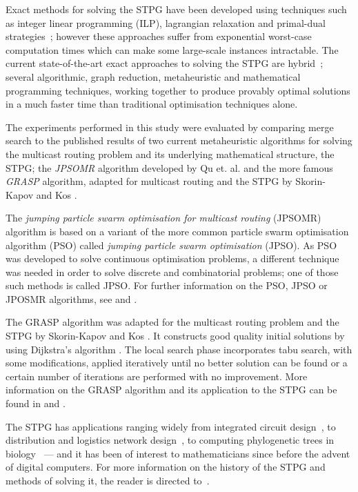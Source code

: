 \documentclass[journal]{IEEEtran}
\begin{document}

Exact methods for solving the STPG have been developed using techniques such as integer linear programming (ILP), lagrangian relaxation and primal-dual strategies~\cite{pd:polzin}; however these approaches suffer from exponential worst-case computation times which can make some large-scale instances intractable. The current state-of-the-art exact approaches to solving the STPG are hybrid~\cite{algo:polzin,algo:daneshmand}; several algorithmic, graph reduction, metaheuristic and mathematical programming techniques, working together to produce provably optimal solutions in a much faster time than traditional optimisation techniques alone.


The experiments performed in this study were evaluated by comparing merge search to the published results of two current metaheuristic algorithms for solving the multicast routing problem and its underlying mathematical structure, the STPG; the \emph{JPSOMR} algorithm developed by Qu et. al. \cite{jpsomr:qu} and the more famous \emph{GRASP} algorithm, adapted for multicast routing and the STPG by Skorin-Kapov and Kos \cite{grasp:skorin}.

The \emph{jumping particle swarm optimisation for multicast routing} (JPSOMR) algorithm is based on a variant of the more common particle swarm optimisation algorithm (PSO) called \emph{jumping particle swarm optimisation} (JPSO). As PSO was developed to solve continuous optimisation problems, a different technique was needed in order to solve discrete and combinatorial problems; one of those such methods is called JPSO. For further information on the PSO, JPSO or JPOSMR algorithms, see \cite{pso:kennedy, jpso:consoli} and \cite{jpsomr:qu}.

The GRASP algorithm was adapted for the multicast routing problem and the STPG by Skorin-Kapov and Kos \cite{grasp:skorin}. It constructs good quality initial solutions by using Dijkstra's algorithm \cite{dijk:dijkstra}. The local search phase incorporates tabu search, with some modifications, applied iteratively until no better solution can be found or a certain number of iterations are performed with no improvement. More information on the GRASP algorithm and its application to the STPG can be found in \cite{grasp:feo, grasp:skorin} and \cite{grasp:martins}.

The STPG has applications ranging widely from integrated circuit design~\cite{vlsi:cho}, to distribution and logistics network design~\cite{stpg-logistics}, to computing phylogenetic trees in biology~\cite{phylo} --- and it has been of interest to mathematicians since before the advent of digital computers. For more information on the history of the STPG and methods of solving it, the reader is directed to~\cite{history:brazil,steiner:hwang,steinerbook,steineradvance}. 
\end{document}
